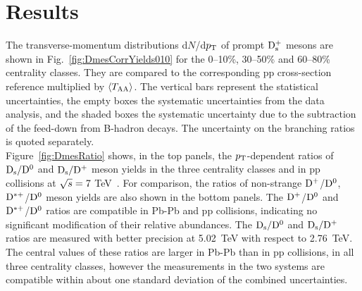 \section{Results}
\label{sec:PbPbResults}
The transverse-momentum distributions d$N$/d$p_{\rm T}$ of prompt ${\rm D_s^+}$ mesons 
are shown in Fig.~\ref{fig:DmesCorrYields010}
for the 0--10\%, 30--50\% and 60--80\% centrality classes. 
They are compared to the corresponding pp cross-section
reference multiplied by $\langle T_{\rm AA} \rangle$.
The vertical bars represent the statistical uncertainties, the empty boxes
the systematic uncertainties from the data analysis, and the shaded boxes
the systematic uncertainty due to the subtraction of the feed-down from 
B-hadron decays. The uncertainty on the branching ratios is quoted separately.\\





Figure~\ref{fig:DmesRatio} shows, in the top panels, the $p_{\rm T}$-dependent ratios of
${\rm D_s}/{\rm D^0}$ and ${\rm D_s}/{\rm D^+}$ meson yields in the three centrality classes and in pp 
collisions at $\sqrt{s} = 7$ TeV~\cite{Acharya:2017jgo}. For comparison, the ratios of 
non-strange ${\rm D^+}$/${\rm D^0}$, ${\rm D^{*+}}$/${\rm D^0}$ meson yields
are also shown in the bottom panels.
The ${\rm D^+}$/${\rm D^0}$ and ${\rm D^{*+}}$/${\rm D^0}$ ratios are compatible in Pb-Pb and pp collisions, 
indicating no significant modification of their relative abundances. 
The ${\rm D_s}/{\rm D^0}$ and ${\rm D_s}/{\rm D^+}$ ratios are measured with better 
precision at 5.02~TeV with respect to 2.76~TeV.
The central values of these ratios are larger in Pb-Pb than in pp collisions, 
in all three centrality classes, however the measurements in the two systems 
are compatible within about one standard deviation of the combined uncertainties.\\

